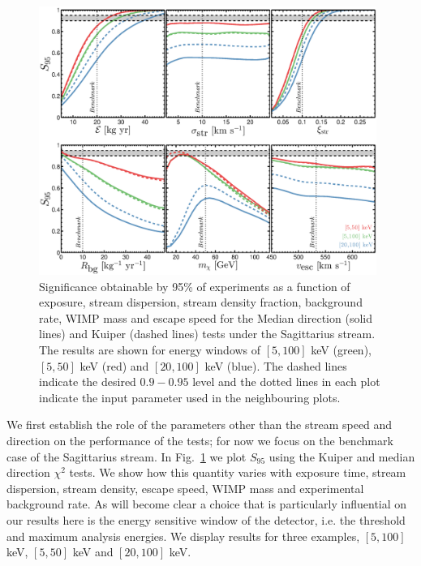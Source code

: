 \begin{figure}
    \centering
    \includegraphics[trim = 0mm 0mm 0mm 0mm, clip, width=0.98\textwidth]{Figures/testcompare_sagit.eps}
    \caption[Results of non-parametric tests as a function of input parameters]{Significance obtainable by 95\% of experiments as a function of exposure, stream dispersion, stream density fraction, background rate, WIMP mass and escape speed for the Median direction (solid lines) and Kuiper (dashed lines) tests under the Sagittarius stream. The results are shown for energy windows of $[5,100]$ keV (green), $[5,50]$ keV (red) and $[20,100]$ keV (blue). The dashed lines indicate the desired $0.9-0.95$ level and the dotted lines in each plot indicate the input parameter used in the neighbouring plots.}
    \label{fig:testcompare_sagit}
\end{figure}
We first establish the role of the parameters other than the stream speed and direction on the performance of the tests; for now we focus on the benchmark case of the Sagittarius stream. In Fig.~\ref{fig:testcompare_sagit} we plot $S_{95}$ using the Kuiper and median direction $\chi^2$ tests. We show how this quantity varies with exposure time, stream dispersion, stream density, escape speed, WIMP mass and experimental background rate. As will become clear a choice that is particularly influential on our results here is the energy sensitive window of the detector, i.e. the threshold and maximum analysis energies. We display results for three examples, $[5,100]$ keV, $[5,50]$ keV and $[20,100]$ keV.

